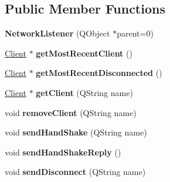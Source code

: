 \subsection*{Public Member Functions}
\begin{DoxyCompactItemize}
\item 
\hypertarget{class_network_listener_ad0b176bc71290ed0d15705ee1ffdcf42}{}{\bfseries Network\+Listener} (Q\+Object $\ast$parent=0)\label{class_network_listener_ad0b176bc71290ed0d15705ee1ffdcf42}

\item 
\hypertarget{class_network_listener_a3bb629317b41d6b1f99a5b07b42a284f}{}\hyperlink{struct_client}{Client} $\ast$ {\bfseries get\+Most\+Recent\+Client} ()\label{class_network_listener_a3bb629317b41d6b1f99a5b07b42a284f}

\item 
\hypertarget{class_network_listener_a9439e56b56ded28da4dc9c8584849e95}{}\hyperlink{struct_client}{Client} $\ast$ {\bfseries get\+Most\+Recent\+Disconnected} ()\label{class_network_listener_a9439e56b56ded28da4dc9c8584849e95}

\item 
\hypertarget{class_network_listener_a30a1a0a5b42a426dc86ac131bd11aafd}{}\hyperlink{struct_client}{Client} $\ast$ {\bfseries get\+Client} (Q\+String name)\label{class_network_listener_a30a1a0a5b42a426dc86ac131bd11aafd}

\item 
\hypertarget{class_network_listener_a989f81e745b1725562da7b6fcfadac83}{}void {\bfseries remove\+Client} (Q\+String name)\label{class_network_listener_a989f81e745b1725562da7b6fcfadac83}

\item 
\hypertarget{class_network_listener_aebdaf064bfc92c215266faa0a07ca61d}{}void {\bfseries send\+Hand\+Shake} (Q\+String name)\label{class_network_listener_aebdaf064bfc92c215266faa0a07ca61d}

\item 
\hypertarget{class_network_listener_a4905e63cbcdd10abd1cfdaff31364383}{}void {\bfseries send\+Hand\+Shake\+Reply} ()\label{class_network_listener_a4905e63cbcdd10abd1cfdaff31364383}

\item 
\hypertarget{class_network_listener_abd383f47c7878354e182093cd615ab23}{}void {\bfseries send\+Disconnect} (Q\+String name)\label{class_network_listener_abd383f47c7878354e182093cd615ab23}

\end{DoxyCompactItemize}
